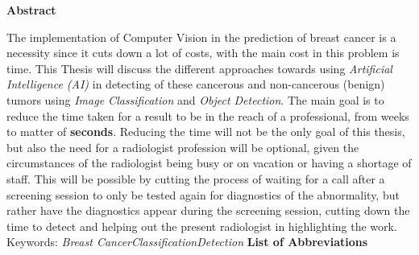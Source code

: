 \documentclass[12pt]{extarticle}
\begin{document}
	\tableofcontents
	\newpage
	\listoffigures
	\listoftables
	\newpage
	\begin{center}
		\LARGE{\textbf{Abstract}}\\ \vspace{1cm}
	\end{center}
	The implementation of Computer Vision in the prediction of breast cancer is a necessity since it cuts down a lot of costs, with the main cost in this problem is time. This Thesis will discuss the different approaches towards using \emph{Artificial Intelligence (AI)} in detecting of these cancerous and non-cancerous (benign) tumors using \emph{Image Classification} and \emph{Object Detection}. The main goal is to reduce the time taken for a result to be in the reach of a professional, from weeks to matter of \textbf{seconds}. Reducing the time will not be the only goal of this thesis, but also the need for a radiologist profession will be optional, given the circumstances of the radiologist being busy or on vacation or having a shortage of staff. This will be possible by cutting the process of waiting for a call after a screening session to only be tested again for diagnostics of the abnormality, but rather have the diagnostics appear during the screening session, cutting down the time to detect and helping out the present radiologist in highlighting the work.\\[10mm]
	Keywords: \emph{Breast Cancer\quad Classification\quad Detection}
	\newpage
	\LARGE{\textbf{List of Abbreviations}}\\ \vspace{1cm}
\end{document}
